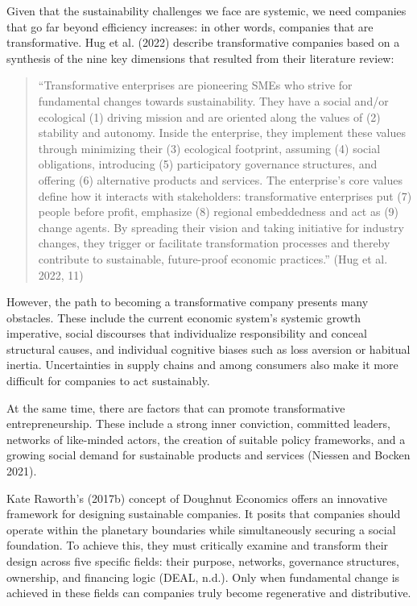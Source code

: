 \documentclass[
  a4paper,
  DIV=11,
  numbers=noendperiod,
  oneside,
  openany]{scrreprt}
\begin{document}
Given that the sustainability challenges we face are systemic, we need
companies that go far beyond efficiency increases: in other words,
companies that are transformative. Hug et al. (2022) describe
transformative companies based on a synthesis of the nine key dimensions
that resulted from their literature review:

\begin{quote}
``Transformative enterprises are pioneering SMEs who strive for
fundamental changes towards sustainability. They have a social and/or
ecological (1) driving mission and are oriented along the values of (2)
stability and autonomy. Inside the enterprise, they implement these
values through minimizing their (3) ecological footprint, assuming (4)
social obligations, introducing (5) participatory governance structures,
and offering (6) alternative products and services. The enterprise's
core values define how it interacts with stakeholders: transformative
enterprises put (7) people before profit, emphasize (8) regional
embeddedness and act as (9) change agents. By spreading their vision and
taking initiative for industry changes, they trigger or facilitate
transformation processes and thereby contribute to sustainable,
future-proof economic practices.'' (Hug et al. 2022, 11)
\end{quote}

However, the path to becoming a transformative company presents many
obstacles. These include the current economic system's systemic growth
imperative, social discourses that individualize responsibility and
conceal structural causes, and individual cognitive biases such as loss
aversion or habitual inertia. Uncertainties in supply chains and among
consumers also make it more difficult for companies to act sustainably.

At the same time, there are factors that can promote transformative
entrepreneurship. These include a strong inner conviction, committed
leaders, networks of like-minded actors, the creation of suitable policy
frameworks, and a growing social demand for sustainable products and
services (Niessen and Bocken 2021).

Kate Raworth's (2017b) concept of Doughnut Economics offers an
innovative framework for designing sustainable companies. It posits that
companies should operate within the planetary boundaries while
simultaneously securing a social foundation. To achieve this, they must
critically examine and transform their design across five specific
fields: their purpose, networks, governance structures, ownership, and
financing logic (DEAL, n.d.). Only when fundamental change is achieved
in these fields can companies truly become regenerative and
distributive.
\end{document}
